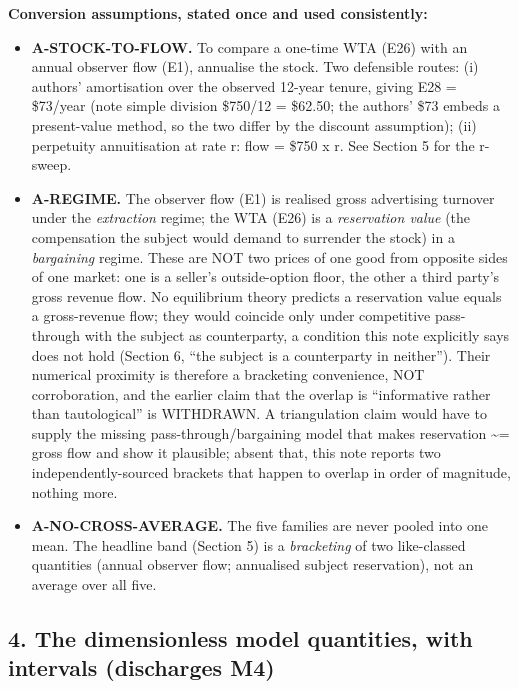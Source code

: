 \documentclass[
  11pt,
]{article}
\providecommand{\tightlist}{%
  \setlength{\itemsep}{0pt}\setlength{\parskip}{0pt}}
\begin{document}
\textbf{Conversion assumptions, stated once and used consistently:}

\begin{itemize}
\tightlist
\item
  \textbf{A-STOCK-TO-FLOW.} To compare a one-time WTA (E26) with an
  annual observer flow (E1), annualise the stock. Two defensible routes:
  (i) authors' amortisation over the observed 12-year tenure, giving E28
  = \$73/year (note simple division \$750/12 = \$62.50; the authors'
  \$73 embeds a present-value method, so the two differ by the discount
  assumption); (ii) perpetuity annuitisation at rate r: flow = \$750 x
  r. See Section 5 for the r-sweep.
\item
  \textbf{A-REGIME.} The observer flow (E1) is realised gross
  advertising turnover under the \emph{extraction} regime; the WTA (E26)
  is a \emph{reservation value} (the compensation the subject would
  demand to surrender the stock) in a \emph{bargaining} regime. These
  are NOT two prices of one good from opposite sides of one market: one
  is a seller's outside-option floor, the other a third party's gross
  revenue flow. No equilibrium theory predicts a reservation value
  equals a gross-revenue flow; they would coincide only under
  competitive pass-through with the subject as counterparty, a condition
  this note explicitly says does not hold (Section 6, ``the subject is a
  counterparty in neither''). Their numerical proximity is therefore a
  bracketing convenience, NOT corroboration, and the earlier claim that
  the overlap is ``informative rather than tautological'' is WITHDRAWN.
  A triangulation claim would have to supply the missing
  pass-through/bargaining model that makes reservation \textasciitilde=
  gross flow and show it plausible; absent that, this note reports two
  independently-sourced brackets that happen to overlap in order of
  magnitude, nothing more.
\item
  \textbf{A-NO-CROSS-AVERAGE.} The five families are never pooled into
  one mean. The headline band (Section 5) is a \emph{bracketing} of two
  like-classed quantities (annual observer flow; annualised subject
  reservation), not an average over all five.
\end{itemize}

\subsection{4. The dimensionless model quantities, with intervals
(discharges
M4)}\label{the-dimensionless-model-quantities-with-intervals-discharges-m4}
\end{document}
